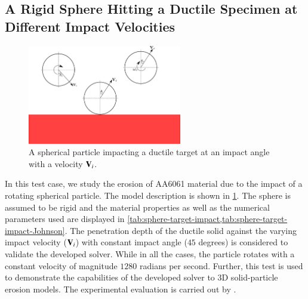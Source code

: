 \FloatBarrier%
\subsection{A Rigid Sphere Hitting a Ductile Specimen at Different Impact Velocities}
\label{sec:erosion-vyas}
\begin{figure}[!htpb]
  \centering
  \includegraphics[width=0.6\textwidth]{images/erosion/images/vyas_2021_rebound_kinematics_3d/cao_drawing}
  \caption{A spherical particle impacting a ductile target at an impact angle
    with a velocity $\mathbf{V}_i$.}
\label{fig:results-cao-3d-erosion-schematic}
\end{figure}
In this test case, we study the erosion of AA6061 material due to the impact of
a rotating spherical particle. The model description is shown in
\cref{fig:results-cao-3d-erosion-schematic}. The sphere is assumed to be rigid
and the material properties as well as the numerical parameters used are
displayed in \cref{tab:sphere-target-impact,tab:sphere-target-impact-Johnson}.
The penetration depth of the ductile solid against the varying impact velocity
($\mathbf{V}_i$) with constant impact angle ($45$ degrees) is considered to
validate the developed solver. While in all the cases, the particle rotates with
a constant velocity of magnitude $1280$ radians per second. Further, this test is used to
demonstrate the capabilities of the developed solver to 3D solid-particle
erosion models. The experimental evaluation is carried out by
\textcite{zang2022investigation}.
